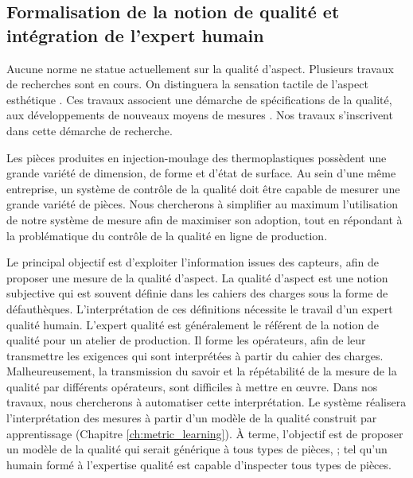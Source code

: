 \subsection{Formalisation de la notion de qualité et intégration de l'expert humain}
Aucune norme ne statue actuellement sur la qualité d'aspect.
Plusieurs travaux de recherches sont en cours.
On distinguera la sensation tactile \cite{bruno_albert_formalisation_2016, albert_generic_2016, albert_smart_2017, albert_smart_2019, albert_maitrise_2019} de l'aspect esthétique \cite{desage_syntactic_2015}.
Ces travaux associent une démarche de spécifications de la qualité, aux développements de nouveaux moyens de mesures \cite{desage_constraints_2015, pitard_metrologie_2016, lacombe_exploitation_2018a}.
Nos travaux s'inscrivent dans cette démarche de recherche.

Les pièces produites en injection-moulage des thermoplastiques possèdent une grande variété de dimension, de forme et d'état de surface.
Au sein d'une même entreprise, un système de contrôle de la qualité doit être capable de mesurer une grande variété de pièces.
Nous chercherons à simplifier au maximum l'utilisation de notre système de mesure afin de maximiser son adoption, tout en répondant à la problématique du contrôle de la qualité en ligne de production.

Le principal objectif est d'exploiter l'information issues des capteurs, afin de proposer une mesure de la qualité d'aspect.
La qualité d'aspect est une notion subjective qui est souvent définie dans les cahiers des charges sous la forme de défauthèques.
L'interprétation de ces définitions nécessite le travail d'un expert qualité humain.
L'expert qualité est généralement le référent de la notion de qualité pour un atelier de production.
Il forme les opérateurs, afin de leur transmettre les exigences qui sont interprétées à partir du cahier des charges.
Malheureusement, la transmission du savoir et la répétabilité de la mesure de la qualité par différents opérateurs, sont difficiles à mettre en œuvre.
Dans nos travaux, nous chercherons à automatiser cette interprétation.
Le système réalisera l'interprétation des mesures à partir d'un modèle de la qualité construit par apprentissage (Chapitre \ref{ch:metric_learning}).
À terme, l'objectif est de proposer un modèle de la qualité qui serait générique à tous types de pièces, ; tel qu'un humain formé à l'expertise qualité est capable d'inspecter tous types de pièces.

